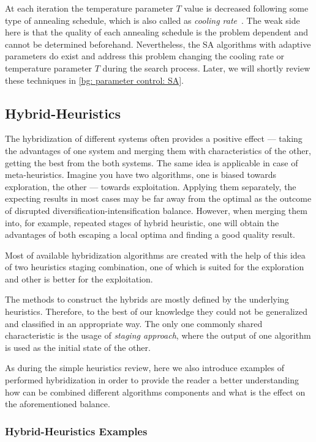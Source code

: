 At each iteration the temperature parameter $T$ value is decreased following some type of annealing schedule, which is also called as \textit{cooling rate}~\cite{boussaid2013survey}. The weak side here is that the quality of each annealing schedule is the problem dependent and cannot be determined beforehand. Nevertheless, the SA algorithms with adaptive parameters do exist and address this problem changing the cooling rate or temperature parameter $T$ during the search process. Later, we will shortly review these techniques in \cref{bg: parameter control: SA}.


\subsection{Hybrid-Heuristics}
The hybridization of different systems often provides a positive effect — taking the advantages of one system and merging them with characteristics of the other, getting the best from the both systems. The same idea is applicable in case of meta-heuristics. Imagine you have two algorithms, one is biased towards exploration, the other — towards exploitation. Applying them separately, the expecting results in most cases may be far away from the optimal as the outcome of disrupted diversification-intensification balance. However, when merging them into, for example, repeated stages of hybrid heuristic, one will obtain the advantages of both escaping a local optima and finding a good quality result. 

Most of available hybridization algorithms are created with the help of this idea of two heuristics staging combination, one of which is suited for the exploration and other is better for the exploitation.

The methods to construct the hybrids are mostly defined by the underlying heuristics. Therefore, to the best of our knowledge they could not be generalized and classified in an appropriate way. The only one commonly shared characteristic is the usage of \textit{staging approach}, where the output of one algorithm is used as the initial state of the other. 

As during the simple heuristics review, here we also introduce examples of performed hybridization in order to provide the reader a better understanding how can be combined different algorithms components and what is the effect on the aforementioned balance.

\subsubsection{Hybrid-Heuristics Examples}
